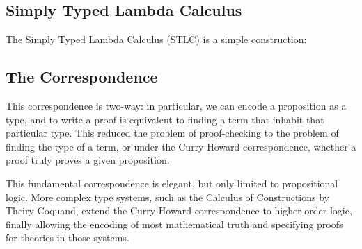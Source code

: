 \subsection{Simply Typed Lambda Calculus}

The Simply Typed Lambda Calculus (STLC) is a simple construction:

\subsection{The Correspondence}
This correspondence is two-way: in particular, we can encode
a proposition as a type, and to write a proof is equivalent to 
finding a term that inhabit that particular type. This reduced the
problem of proof-checking to the problem of finding the type of a term,
or under the Curry-Howard correspondence, whether a proof truly proves
a given proposition.

This fundamental correspondence is elegant, but only limited to 
propositional logic. More complex type systems, such as the
Calculus of Constructions by Theiry Coquand, extend the Curry-Howard
correspondence to higher-order logic, finally allowing the encoding of
most mathematical truth and specifying proofs for theories in those 
systems.
